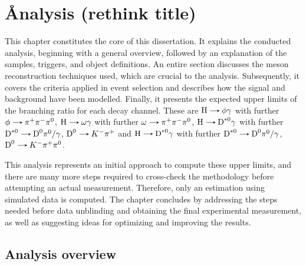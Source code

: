 \chapter[Analysis]{\r Analysis (rethink title)}\label{chap:analysis}

This chapter constitutes the core of this dissertation. It explains the conducted analysis, beginning with a general overview, followed by an explanation of the samples, triggers, and object definitions. An entire section discusses the meson reconstruction techniques used, which are crucial to the analysis. Subsequently, it covers the criteria applied in event selection and describes how the signal and background have been modelled. Finally, it presents the expected upper limits of the branching ratio for each decay channel. These are $\text{H}\decaysto \phi\gamma$ with further $\phi\decaysto \pi^+\pi^-\pi^0$, $\text{H}\decaysto \omega\gamma$ with further $\omega\decaysto \pi^+\pi^-\pi^0$, $\text{H}\decaysto \text{D}^{*0}\gamma$ with further $\text{D}^{*0}\decaysto \text{D}^{0}\pi^{0}/\gamma$, $\text{D}^{0}\decaysto K^{-}\pi^{+}$ and $\text{H}\decaysto \text{D}^{*0}\gamma$ with further $\text{D}^{*0}\decaysto \text{D}^{0}\pi^{0}/\gamma$, $\text{D}^{0}\decaysto K^{-}\pi^{+}\pi^{0}$.

This analysis represents an initial approach to compute these upper limits, and there are many more steps required to cross-check the methodology before attempting an actual measurement. Therefore, only an estimation using simulated data is computed. The chapter concludes by addressing the steps needed before data unblinding and obtaining the final experimental measurement, as well as suggesting ideas for optimizing and improving the results.

\section{Analysis overview}\label{sec:analysis_overview}

